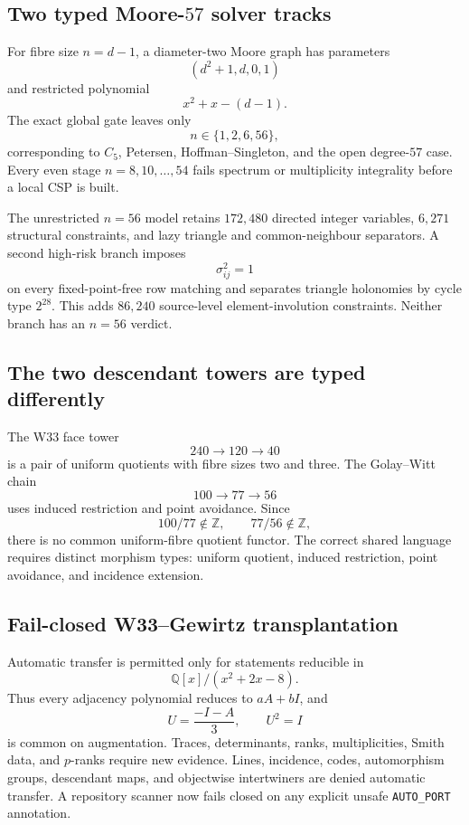 \subsection{Two typed Moore-$57$ solver tracks}

For fibre size $n=d-1$, a diameter-two Moore graph has parameters
\[
(d^2+1,d,0,1)
\]
and restricted polynomial
\[
x^2+x-(d-1).
\]
The exact global gate leaves only
\[
\boxed{n\in\{1,2,6,56\}},
\]
corresponding to $C_5$, Petersen, Hoffman--Singleton, and the open degree-$57$ case.  Every even stage $n=8,10,\ldots,54$ fails spectrum or multiplicity integrality before a local CSP is built.

The unrestricted $n=56$ model retains $172{,}480$ directed integer variables, $6{,}271$ structural constraints, and lazy triangle and common-neighbour separators.  A second high-risk branch imposes
\[
\sigma_{ij}^2=1
\]
on every fixed-point-free row matching and separates triangle holonomies by cycle type $2^{28}$.  This adds $86{,}240$ source-level element-involution constraints.  Neither branch has an $n=56$ verdict.

\subsection{The two descendant towers are typed differently}

The W33 face tower
\[
240\longrightarrow120\longrightarrow40
\]
is a pair of uniform quotients with fibre sizes two and three.  The Golay--Witt chain
\[
100\longrightarrow77\longrightarrow56
\]
uses induced restriction and point avoidance.  Since
\[
100/77\notin\mathbb Z,
\qquad
77/56\notin\mathbb Z,
\]
there is no common uniform-fibre quotient functor.  The correct shared language requires distinct morphism types: uniform quotient, induced restriction, point avoidance, and incidence extension.

\subsection{Fail-closed W33--Gewirtz transplantation}

Automatic transfer is permitted only for statements reducible in
\[
\mathbb Q[x]/(x^2+2x-8).
\]
Thus every adjacency polynomial reduces to $aA+bI$, and
\[
U=\frac{-I-A}{3},
\qquad U^2=I
\]
is common on augmentation.  Traces, determinants, ranks, multiplicities, Smith data, and $p$-ranks require new evidence.  Lines, incidence, codes, automorphism groups, descendant maps, and objectwise intertwiners are denied automatic transfer.  A repository scanner now fails closed on any explicit unsafe \texttt{AUTO\_PORT} annotation.

